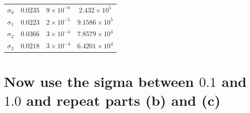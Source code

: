 \documentclass[12pt,letterpaper, onecolumn]{exam}
\begin{document}
\begin{questions}
\begin{parts}
{\begin{table}[h!]
\begin{tabular}{|c|c|c|c|}
                    \hline
                    $\sigma_0$ & $0.0235$        & $9\times10^{-6}$  & $2.432\times10^5$  \\
                    $\sigma_1$ & $0.0223$        & $2\times10^{-5}$  & $9.1586\times10^5$ \\
                    $\sigma_2$ & $0.0366$        & $3\times10^{-4}$  & $7.8579\times10^4$ \\
                    $\sigma_3$ & $0.0218$        & $3\times10^{-4}$  & $6.4201\times10^4$ \\
                    \hline
                \end{tabular}
            \end{table}
        }
        \clearpage
        \part{Now use the sigma between $0.1$ and $1.0$ and repeat parts (b) and (c)}

\end{parts}
\end{questions}
\end{document}
